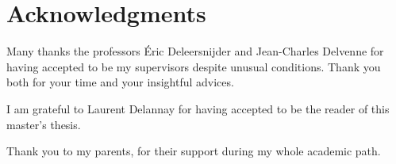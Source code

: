 \section*{Acknowledgments}
\begin{flushright}
\leftskip=6cm
Many thanks the professors Éric Deleersnijder and Jean-Charles Delvenne for having accepted to be my supervisors despite unusual conditions. Thank you both for your time and your insightful advices.\newline

I am grateful to Laurent Delannay for having accepted to be the reader of this master's thesis.\newline

Thank you to my parents, for their support during my whole academic path.\newline
\end{flushright}
